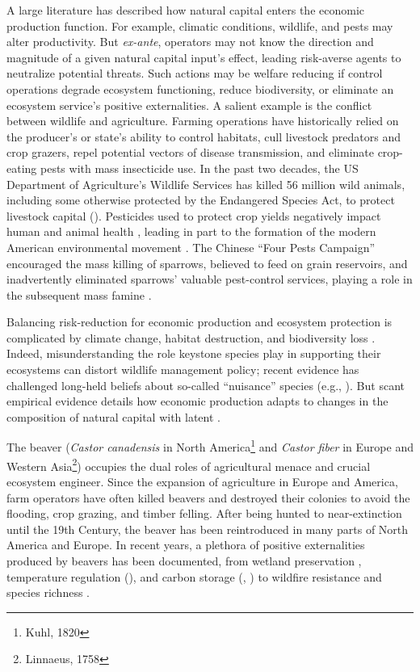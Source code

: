 A large literature has described how natural capital enters the economic production function. For example, climatic conditions, wildlife, and pests may alter productivity. But \textit{ex-ante}, operators may not know the direction and magnitude of a given natural capital input's effect, leading risk-averse agents to neutralize potential threats. Such actions may be welfare reducing if control operations degrade ecosystem functioning, reduce biodiversity, or eliminate an ecosystem service's positive externalities. A salient example is the conflict between wildlife and agriculture. Farming operations have historically relied on the producer's or state's ability to control habitats, cull livestock predators and crop grazers, repel potential vectors of disease transmission, and eliminate crop-eating pests with mass insecticide use. In the past two decades, the US Department of Agriculture's Wildlife Services has killed 56 million wild animals, including some otherwise protected by the Endangered Species Act, to protect livestock capital (\cite{torrella_inside_2024}). Pesticides used to protect crop yields negatively impact human and animal health \citep{larsen_agricultural_2017}, leading in part to the formation of the modern American environmental movement \citep{woodwell_broken_1984}. The Chinese ``Four Pests Campaign'' encouraged the mass killing of sparrows, believed to feed on grain reservoirs, and inadvertently eliminated sparrows' valuable pest-control services, playing a role in the subsequent mass famine \citep{frank_campaigning_2024}. 

Balancing risk-reduction for economic production and ecosystem protection is complicated by climate change, habitat destruction, and biodiversity loss \citep{cardinale_biodiversity_2012}. Indeed, misunderstanding the role keystone species play in supporting their ecosystems can distort wildlife management policy; recent evidence has challenged long-held beliefs about so-called ``nuisance'' species (e.g., \cite{raynor_wolves_2021}). But scant empirical evidence details how economic production adapts to changes in the composition of natural capital with latent .

The beaver (\textit{Castor canadensis} in North America\footnote{Kuhl, 1820} and \textit{Castor fiber} in Europe and Western Asia\footnote{Linnaeus, 1758}) occupies the dual roles of agricultural menace and crucial ecosystem engineer. Since the expansion of agriculture in Europe and America, farm operators have often killed beavers and destroyed their colonies to avoid the flooding, crop grazing, and timber felling. After being hunted to near-extinction until the 19th Century, the beaver has been reintroduced in many parts of North America and Europe. In recent years, a plethora of positive externalities produced by beavers has been documented, from wetland preservation \citep{hood_beaver_2008}, temperature regulation (\cite{dittbrenner_relocated_2022}), and carbon storage (\cite{wohl_landscape-scale_2013}, \cite{johnston_beaver_2014}) to wildfire resistance \citep{fairfax_smokey_2020} and species richness \citep{wright_ecosystem_2002}.

